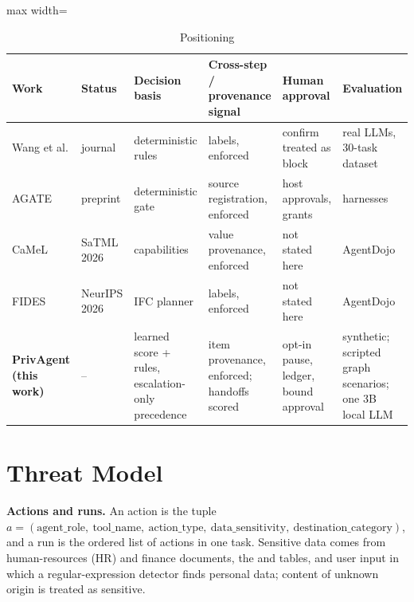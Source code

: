 \documentclass{ieeeaccess}
\begin{document}
\begin{table}[!t]
\centering
\caption{Positioning}\label{tab:I}
\setlength{\tabcolsep}{4pt}
\begin{adjustbox}{max width=\textwidth}
{\footnotesize
\begin{tabular}{>{\raggedright\arraybackslash}p{2.2cm}>{\raggedright\arraybackslash}p{1.5cm}>{\raggedright\arraybackslash}p{2.5cm}>{\raggedright\arraybackslash}p{3.0cm}>{\raggedright\arraybackslash}p{2.7cm}>{\raggedright\arraybackslash}p{3.6cm}}
\hline
\textbf{Work} & \textbf{Status} & \textbf{Decision basis} & \textbf{Cross-step / provenance signal} & \textbf{Human approval} & \textbf{Evaluation} \\
\hline
Wang et al. \cite{wangpep} & journal & deterministic rules & labels, enforced & confirm treated as block & real LLMs, 30-task dataset \\
AGATE \cite{agate} & preprint & deterministic gate & source registration, enforced & host approvals, grants & 3 harnesses \\
CaMeL \cite{camel} & SaTML 2026 & capabilities & value provenance, enforced & not stated here & AgentDojo \\
FIDES \cite{fides} & NeurIPS 2026 & IFC planner & labels, enforced & not stated here & AgentDojo \\
\textbf{PrivAgent (this work)} & -- & learned score + rules, escalation-only precedence & item provenance, enforced; handoffs scored & opt-in pause, ledger, bound approval & synthetic; scripted graph scenarios; one 3B local LLM \\
\hline
\end{tabular}}
\end{adjustbox}
\par{}
\end{table}

\section{Threat Model}\label{sec:III}

\textbf{Actions and runs.} An action is the tuple $a = (\mathrm{agent\_role},\ \mathrm{tool\_name},\ \mathrm{action\_type},\ \mathrm{data\_sensitivity},\ \mathrm{destination\_category})$, and a run is the ordered list of actions in one task. Sensitive data comes from human-resources (HR) and finance documents, the  and  tables, and user input in which a regular-expression detector finds personal data; content of unknown origin is treated as sensitive.
\end{document}

